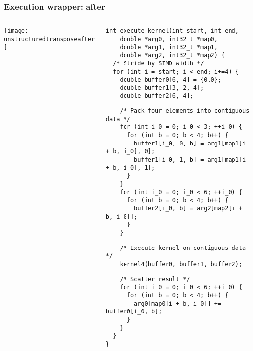 \documentclass[presentation,aspectratio=43,10pt]{beamer}
\begin{document}
\begin{frame}[fragile]
  \frametitle{Execution wrapper: after}
  \begin{columns}
    \begin{column}{0.5\textwidth}
      \begin{center}
        \texttt{[image: unstructuredtransposeafter]}
      \end{center}
    \end{column}
    \begin{column}{0.5\textwidth}
\begin{verbatim}
int execute_kernel(int start, int end,
    double *arg0, int32_t *map0,
    double *arg1, int32_t *map1,
    double *arg2, int32_t *map2) {
  /* Stride by SIMD width */
  for (int i = start; i < end; i+=4) {
    double buffer0[6, 4] = {0.0};
    double buffer1[3, 2, 4];
    double buffer2[6, 4];
\end{verbatim}
      \vspace{-1.2\baselineskip}
\begin{verbatim}
    /* Pack four elements into contiguous data */
    for (int i_0 = 0; i_0 < 3; ++i_0) {
      for (int b = 0; b < 4; b++) {
        buffer1[i_0, 0, b] = arg1[map1[i + b, i_0], 0];
        buffer1[i_0, 1, b] = arg1[map1[i + b, i_0], 1];
      }
    }
    for (int i_0 = 0; i_0 < 6; ++i_0) {
      for (int b = 0; b < 4; b++) {
        buffer2[i_0, b] = arg2[map2[i + b, i_0]];
      }
    }
\end{verbatim}
      \vspace{-2.4\baselineskip}
\begin{verbatim}
    /* Execute kernel on contiguous data */
    kernel4(buffer0, buffer1, buffer2);
\end{verbatim}
      \vspace{-2.4\baselineskip}
\begin{verbatim}
    /* Scatter result */
    for (int i_0 = 0; i_0 < 6; ++i_0) {
      for (int b = 0; b < 4; b++) {
        arg0[map0[i + b, i_0]] += buffer0[i_0, b];
      }
    }
  }
}
\end{verbatim}
    \end{column}
  \end{columns}
\end{frame}
\end{document}
